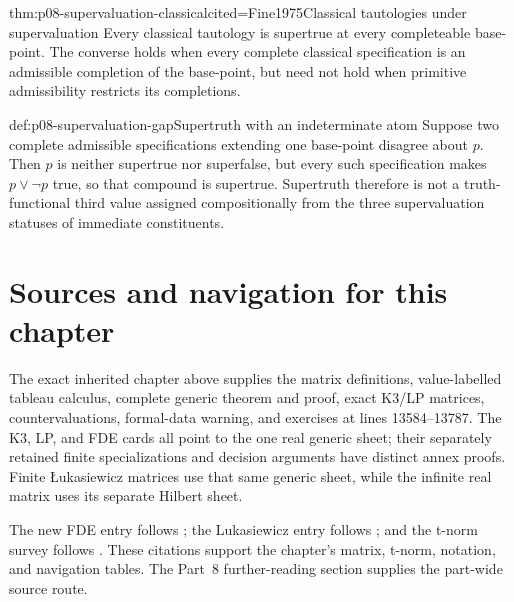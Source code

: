 \begin{hbtheorem}{thm:p08-supervaluation-classical}{cited=Fine1975}{Classical tautologies under supervaluation}
Every classical tautology is supertrue at every completeable base-point.  The
converse holds when every complete classical specification is an admissible
completion of the base-point, but need not hold when primitive admissibility
restricts its completions.
\end{hbtheorem}

\begin{hbexample}{def:p08-supervaluation-gap}{Supertruth with an indeterminate atom}
Suppose two complete admissible specifications extending one base-point
disagree about \(p\).  Then \(p\) is neither supertrue nor superfalse, but every
such specification makes
\(p\lor\neg p\) true, so that compound is supertrue.  Supertruth therefore is
not a truth-functional third value assigned compositionally from the three
supervaluation statuses of immediate constituents.
\end{hbexample}

\section{Sources and navigation for this chapter}

The exact inherited chapter above supplies the matrix definitions, value-labelled
tableau calculus, complete generic theorem and proof, exact K3/LP matrices,
countervaluations, formal-data warning, and exercises at lines 13584--13787.
The K3, LP, and FDE cards all point to the one real generic sheet; their
separately retained finite specializations and decision arguments have distinct
annex proofs.  Finite \L{}ukasiewicz matrices use that same generic sheet,
while the infinite real matrix uses its separate Hilbert sheet.

The new FDE entry follows \cite{Dunn1976,Belnap1977,OmoriWansing2017}; the
Lukasiewicz entry follows
\cite{LukasiewiczTarski1930,McNaughton1951,CignoliDOttavianoMundici2000}; and
the t-norm survey follows
\cite{Hajek1998,EstevaGodo2001,CintulaHajekNoguera2011}.  These citations
support the chapter's matrix, t-norm, notation, and navigation tables.  The Part~8
further-reading section supplies the part-wide source route.
